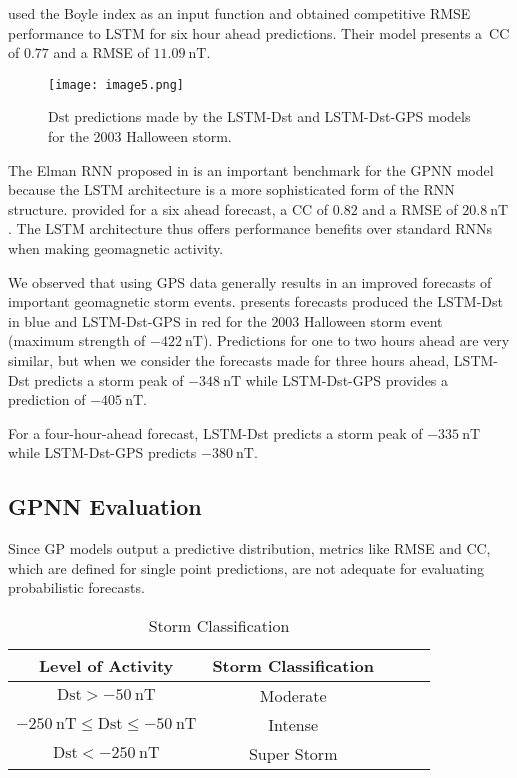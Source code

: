 \citet{Bala2012} used the Boyle index as an input function and obtained competitive RMSE 
performance to LSTM for six hour ahead predictions. Their model presents a\ CC of $0.77$ and a 
RMSE of $\SI{11.09}{\nano\tesla}$.
%
\begin{figure}
	\texttt{[image: image5.png]}
	\caption{$\mathrm{Dst}$ predictions made by the LSTM-Dst and LSTM-Dst-GPS models for the 2003 Halloween storm.}
    \label{fig:lstmhalloween}
\end{figure}
%
The Elman RNN proposed in \citet{wu1997geomagnetic} is an important benchmark for the GPNN model 
because the LSTM architecture is a more sophisticated form of the RNN structure. 
\citet{wu1997geomagnetic} provided for a six ahead forecast, a CC of $0.82$ and a RMSE of 
$\SI{20.8}{\nano\tesla}$. The LSTM architecture thus offers performance benefits over standard 
RNNs when making geomagnetic activity.
 
We observed that using GPS data generally results in an improved forecasts of important geomagnetic 
storm events.  presents forecasts produced the LSTM-Dst in blue and 
LSTM-Dst-GPS in red for the $2003$ Halloween storm event 
(maximum strength of $\SI{-422}{\nano\tesla}$). Predictions for one to two hours ahead are very 
similar, but when we consider the forecasts made for three hours ahead, LSTM-Dst predicts a storm 
peak of $\SI{-348}{\nano\tesla}$ while LSTM-Dst-GPS provides a prediction of 
$\SI{-405}{\nano\tesla}$. 

For a four-hour-ahead forecast, LSTM-Dst predicts a storm peak of $\SI{-335}{\nano\tesla}$ while 
LSTM-Dst-GPS predicts $\SI{-380}{\nano\tesla}$.



\subsection{GPNN Evaluation}

Since GP models output a predictive distribution, metrics like RMSE and CC, which are defined for 
single point predictions, are not adequate for evaluating probabilistic forecasts.

\begin{table}[ht]
	\centering
	\caption{Storm Classification}
	\label{table:stormclass}
	\begin{tabular}{ccccc}
	\hline
	\textbf{Level of Activity} & \textbf{Storm Classification} \\ \hline
	$\mathrm{Dst} > \SI{-50}{\nano\tesla}$ & Moderate\\
	$\SI{-250}{\nano\tesla} \leq \mathrm{Dst} \leq \SI{-50}{\nano\tesla}$ & Intense\\
	$\mathrm{Dst} < \SI{-250}{\nano\tesla}$ & Super Storm\\ \hline
	\end{tabular}
\end{table}

